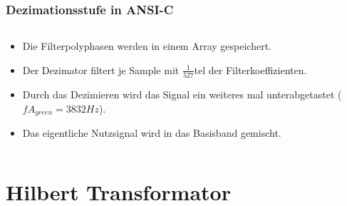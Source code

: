 \documentclass{beamer}
\begin{document}
\begin{frame}[fragile]
  \frametitle{Dezimationsstufe in ANSI-C}
  \begin{columns}
    \begin{column}{0.7\textwidth}
      \begin{itemize}
        \item Die Filterpolyphasen werden in einem Array gespeichert.
        \item Der Dezimator filtert je Sample mit
        $\frac{1}{527}$tel
der Filterkoeffizienten.
        \item Durch das Dezimieren wird das Signal ein weiteres mal unterabgetastet ($fA_{green} = 3832Hz$).
        \item Das eigentliche Nutzsignal wird in das Basisband gemischt.
      \end{itemize}
    \end{column}
    \begin{column}{0.7\textwidth}

    \end{column}
  \end{columns}
  
\end{frame}

\section{Hilbert Transformator}
\end{document}
